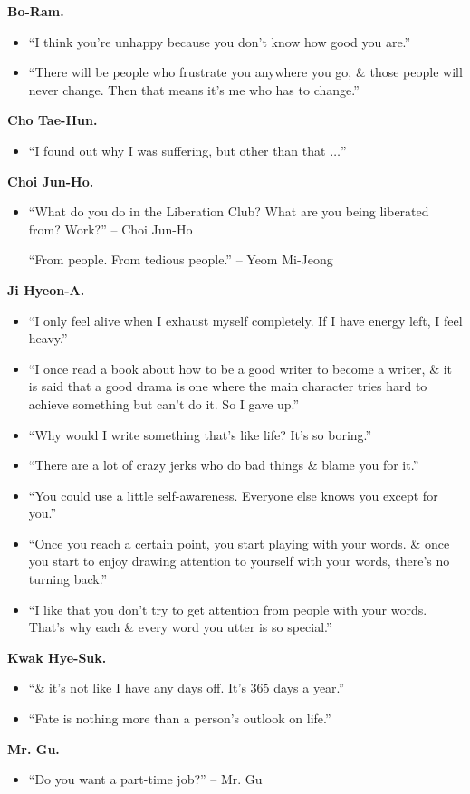 \documentclass{article}
\numberwithin{equation}{section}
\begin{document}
\begin{enumerate}
	\textbf{Bo-Ram.}
	\begin{itemize}
		\item ``I think you're unhappy because you don't know how good you are.''
		\item ``There will be people who frustrate you anywhere you go, \& those people will never change. Then that means it's me who has to change.''
	\end{itemize}
	\textbf{Cho Tae-Hun.}
	\begin{itemize}
		\item ``I found out why I was suffering, but other than that $\ldots$''
	\end{itemize}
	\textbf{Choi Jun-Ho.}
	\begin{itemize}
		\item ``What do you do in the Liberation Club? What are you being liberated from? Work?'' -- Choi Jun-Ho
		
		``From people. From tedious people.'' -- Yeom Mi-Jeong
	\end{itemize}
	\textbf{Ji Hyeon-A.}
	\begin{itemize}
		\item ``I only feel alive when I exhaust myself completely. If I have energy left, I feel heavy.''
		\item ``I once read a book about how to be a good writer to become a writer, \& it is said that a good drama is one where the main character tries hard to achieve something but can't do it. So I gave up.''
		\item ``Why would I write something that's like life? It's so boring.''
		\item ``There are a lot of crazy jerks who do bad things \& blame you for it.''
		\item ``You could use a little self-awareness. Everyone else knows you except for you.''
		\item ``Once you reach a certain point, you start playing with your words. \& once you start to enjoy drawing attention to yourself with your words, there's no turning back.''
		\item ``I like that you don't try to get attention from people with your words. That's why each \& every word you utter is so special.''
	\end{itemize}
	\textbf{Kwak Hye-Suk.}
	\begin{itemize}
		\item ``\& it's not like I have any days off. It's 365 days a year.''
		\item ``Fate is nothing more than a person's outlook on life.''
	\end{itemize}
	\textbf{Mr. Gu.}
	\begin{itemize}
		\item ``Do you want a part-time job?'' -- Mr. Gu
		

\end{itemize}
\end{enumerate}
\end{document}
